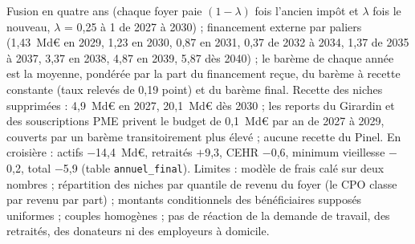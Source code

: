 Fusion en quatre ans (chaque foyer paie $(1-\lambda)$ fois l'ancien impôt et $\lambda$ fois le nouveau, $\lambda$ = 0,25 à 1 de 2027 à 2030) ; financement externe par paliers (1,43~Md€ en 2029, 1,23 en 2030, 0,87 en 2031, 0,37 de 2032 à 2034, 1,37 de 2035 à 2037, 3,37 en 2038, 4,87 en 2039, 5,87 dès 2040) ; le barème de chaque année est la moyenne, pondérée par la part du financement reçue, du barème à recette constante (taux relevés de 0,19 point) et du barème final. Recette des niches supprimées : 4,9~Md€ en 2027, 20,1~Md€ dès 2030 ; les reports du Girardin et des souscriptions PME privent le budget de 0,1~Md€ par an de 2027 à 2029, couverts par un barème transitoirement plus élevé ; aucune recette du Pinel. En croisière : actifs $-$14,4~Md€, retraités $+$9,3, CEHR $-$0,6, minimum vieillesse $-$0,2, total $-$5,9 (table \texttt{annuel\_final}). Limites : modèle de frais calé sur deux nombres ; répartition des niches par quantile de revenu du foyer (le CPO classe par revenu par part) ; montants conditionnels des bénéficiaires supposés uniformes ; couples homogènes ; pas de réaction de la demande de travail, des retraités, des donateurs ni des employeurs à domicile.
